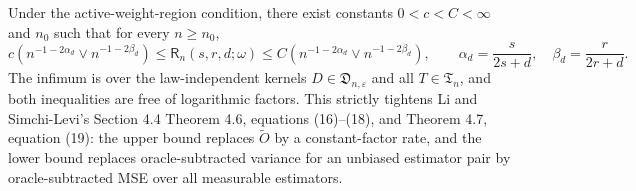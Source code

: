 Under the active-weight-region condition, there exist constants \(0<c<C<\infty\) and \(n_0\) such that for every \(n\ge n_0\), \[c\left(n^{-1-2\alpha_d}\vee n^{-1-2\beta_d}\right)\le\mathsf R_n(s,r,d;\omega)\le C\left(n^{-1-2\alpha_d}\vee n^{-1-2\beta_d}\right),\qquad \alpha_d=\frac{s}{2s+d},\quad\beta_d=\frac{r}{2r+d}.\] The infimum is over the law-independent kernels \(D\in\mathfrak D_{n,\varepsilon}\) and all \(T\in\mathfrak T_n\), and both inequalities are free of logarithmic factors. This strictly tightens Li and Simchi-Levi's Section 4.4 Theorem 4.6, equations (16)--(18), and Theorem 4.7, equation (19): the upper bound replaces \(\widetilde O\) by a constant-factor rate, and the lower bound replaces oracle-subtracted variance for an unbiased estimator pair by oracle-subtracted MSE over all measurable estimators.